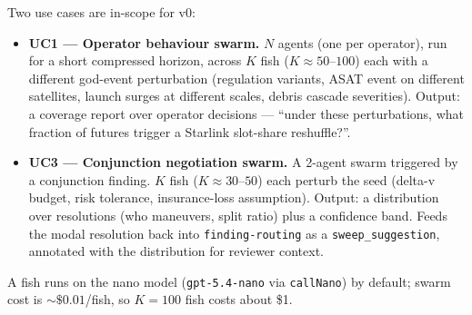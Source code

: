 Two use cases are in-scope for v0:
\begin{itemize}[leftmargin=1.2em]
  \item \textbf{UC1 --- Operator behaviour swarm.} $N$ agents (one per operator), run for a short compressed horizon, across $K$ fish ($K \approx 50$--$100$) each with a different god-event perturbation (regulation variants, ASAT event on different satellites, launch surges at different scales, debris cascade severities). Output: a coverage report over operator decisions --- ``under these perturbations, what fraction of futures trigger a Starlink slot-share reshuffle?''.
  \item \textbf{UC3 --- Conjunction negotiation swarm.} A 2-agent swarm triggered by a conjunction finding. $K$ fish ($K \approx 30$--$50$) each perturb the seed (delta-v budget, risk tolerance, insurance-loss assumption). Output: a distribution over resolutions (who maneuvers, split ratio) plus a confidence band. Feeds the modal resolution back into \texttt{finding-routing} as a \texttt{sweep\_suggestion}, annotated with the distribution for reviewer context.
\end{itemize}

A fish runs on the nano model (\texttt{gpt-5.4-nano} via \texttt{callNano}) by default; swarm cost is $\sim\$0.01$/fish, so $K = 100$ fish costs about \$1.

